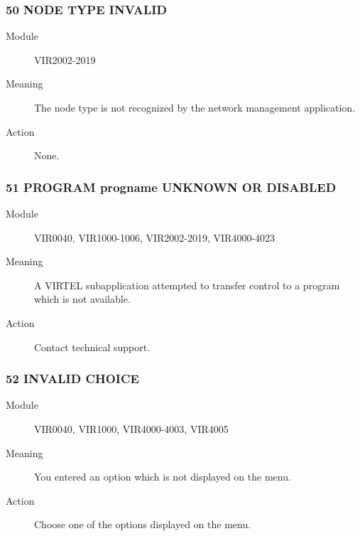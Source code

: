 \documentclass[letterpaper,10pt,english]{sphinxmanual}
\begin{document}
\subsubsection{50 NODE TYPE INVALID}
\label{\detokenize{messages:node-type-invalid}}\begin{description}
\item[{Module}] \leavevmode
VIR2002-2019

\item[{Meaning}] \leavevmode
The node type is not recognized by the network management application.

\item[{Action}] \leavevmode
None.

\end{description}


\subsubsection{51 PROGRAM progname UNKNOWN OR DISABLED}
\label{\detokenize{messages:program-progname-unknown-or-disabled}}\begin{description}
\item[{Module}] \leavevmode
VIR0040, VIR1000-1006, VIR2002-2019, VIR4000-4023

\item[{Meaning}] \leavevmode
A VIRTEL subapplication attempted to transfer control to a program which is not available.

\item[{Action}] \leavevmode
Contact technical support.

\end{description}


\subsubsection{52 INVALID CHOICE}
\label{\detokenize{messages:invalid-choice}}\begin{description}
\item[{Module}] \leavevmode
VIR0040, VIR1000, VIR4000-4003, VIR4005

\item[{Meaning}] \leavevmode
You entered an option which is not displayed on the menu.

\item[{Action}] \leavevmode
Choose one of the options displayed on the menu.

\end{description}
\end{document}
